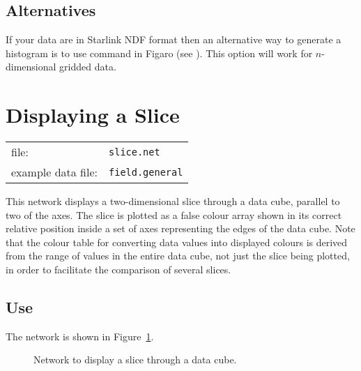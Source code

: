 \subsection{Alternatives}

If your data are in Starlink NDF format then an alternative way to
generate a histogram is to use command  in 
Figaro (see \cite{SUN86}).  This option will work
for $n$-dimensional gridded data.


\newpage
\section{\label{SLICNET}Displaying a Slice}


\begin{tabular}{ll}
file:              & {\tt slice.net}     \\
example data file: & {\tt field.general} \\
\end{tabular}

This network displays a two-dimensional slice through a data cube,
parallel to two of the axes. The slice is plotted as a false colour
array shown in its correct relative position inside a set of axes
representing the edges of the data cube. Note that the colour table for
converting data values into displayed colours is derived from the range
of values in the entire data cube, not just the slice being plotted,
in order to facilitate the comparison of several slices.

\subsection{Use}

The network is shown in Figure~\ref{SLICNETF}.

\begin{figure}[htbp]

\begin{center}
\leavevmode
\epsfxsize=553pt
\end{center}

\caption[Network to display a slice through a data cube.]{Network to
display a slice through a data cube. \label{SLICNETF} }

\end{figure}

